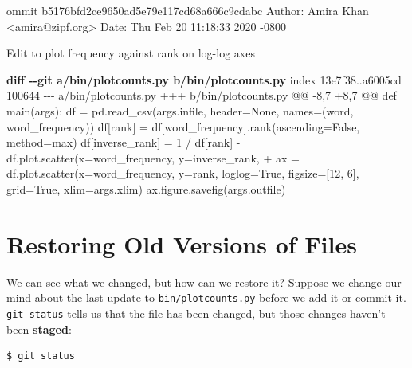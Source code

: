 \documentclass[
]{krantz}
\makeatletter
\newenvironment{Shaded}{\begin{snugshade}}{\end{snugshade}}
\newcommand{\DataTypeTok}[1]{\textcolor[rgb]{0.13,0.29,0.53}{#1}}
\newcommand{\KeywordTok}[1]{\textcolor[rgb]{0.13,0.29,0.53}{\textbf{#1}}}
\newcommand{\NormalTok}[1]{#1}
\newcommand{\StringTok}[1]{\textcolor[rgb]{0.31,0.60,0.02}{#1}}
\newcommand{\VariableTok}[1]{\textcolor[rgb]{0.00,0.00,0.00}{#1}}
\newenvironment{kframe}{%
\medskip{}
\setlength{\fboxsep}{.8em}
 \def\at@end@of@kframe{}%
 \ifinner\ifhmode%
  \def\at@end@of@kframe{\end{minipage}}%
  \begin{minipage}{\columnwidth}%
 \fi\fi%
 \def\FrameCommand##1{\hskip\@totalleftmargin \hskip-\fboxsep
 \colorbox{shadecolor}{##1}\hskip-\fboxsep
     \hskip-\linewidth \hskip-\@totalleftmargin \hskip\columnwidth}%
 \MakeFramed {\advance\hsize-\width
   \@totalleftmargin\z@ \linewidth\hsize
   \@setminipage}}%
 {\par\unskip\endMakeFramed%
 \at@end@of@kframe}
\renewenvironment{Shaded}{\begin{kframe}}{\end{kframe}}
\newcommand{\gref}[2]{\hyperlink{#2}{\textbf{#1}}}
\makeatother
\begin{document}
\begin{Shaded}
\begin{Highlighting}[]
\NormalTok{ommit b5176bfd2ce9650ad5e79e117cd68a666c9cdabc}
\NormalTok{Author: Amira Khan \textless{}amira@zipf.org\textgreater{}}
\NormalTok{Date:   Thu Feb 20 11:18:33 2020 {-}0800}

\NormalTok{    Edit to plot frequency against rank on log{-}log axes}

\KeywordTok{diff {-}{-}git a/bin/plotcounts.py b/bin/plotcounts.py}
\NormalTok{index 13e7f38..a6005cd 100644}
\DataTypeTok{{-}{-}{-} a/bin/plotcounts.py}
\DataTypeTok{+++ b/bin/plotcounts.py}
\DataTypeTok{@@ {-}8,7 +8,7 @@ def main(args):}
\NormalTok{     df = pd.read\_csv(args.infile, header=None, names=(\textquotesingle{}word\textquotesingle{}, \textquotesingle{}word\_frequency\textquotesingle{}))}
\NormalTok{     df[\textquotesingle{}rank\textquotesingle{}] = df[\textquotesingle{}word\_frequency\textquotesingle{}].rank(ascending=False, method=\textquotesingle{}max\textquotesingle{})}
\NormalTok{     df[\textquotesingle{}inverse\_rank\textquotesingle{}] = 1 / df[\textquotesingle{}rank\textquotesingle{}]}
\StringTok{{-}    df.plot.scatter(x=\textquotesingle{}word\_frequency\textquotesingle{}, y=\textquotesingle{}inverse\_rank\textquotesingle{},}
\VariableTok{+    ax = df.plot.scatter(x=\textquotesingle{}word\_frequency\textquotesingle{}, y=\textquotesingle{}rank\textquotesingle{}, loglog=True,}
\NormalTok{                          figsize=[12, 6], grid=True, xlim=args.xlim)}
\NormalTok{     ax.figure.savefig(args.outfile)}
\end{Highlighting}
\end{Shaded}

\hypertarget{git-cmdline-restore}{%
\section{Restoring Old Versions of Files}\label{git-cmdline-restore}}

We can see what we changed,
but how can we restore it?
Suppose we change our mind about the last update to \texttt{bin/plotcounts.py}
before we add it or commit it.
\texttt{git\ status} tells us that the file has been changed,
but those changes haven't been \gref{staged}{git\_stage}:

\begin{verbatim}
$ git status
\end{verbatim}
\end{document}
